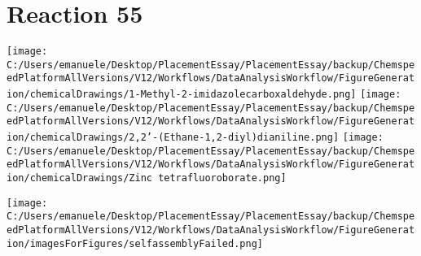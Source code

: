 \documentclass{article}%
\begin{document}
\section*{Reaction 55}%
%
\begin{scheme}[H]%
\begin{minipage}{0.5\textwidth}%
\texttt{[image: C:/Users/emanuele/Desktop/PlacementEssay/PlacementEssay/backup/ChemspeedPlatformAllVersions/V12/Workflows/DataAnalysisWorkflow/FigureGeneration/chemicalDrawings/1-Methyl-2-imidazolecarboxaldehyde.png]}%
\texttt{[image: C:/Users/emanuele/Desktop/PlacementEssay/PlacementEssay/backup/ChemspeedPlatformAllVersions/V12/Workflows/DataAnalysisWorkflow/FigureGeneration/chemicalDrawings/2,2'-(Ethane-1,2-diyl)dianiline.png]}%
\texttt{[image: C:/Users/emanuele/Desktop/PlacementEssay/PlacementEssay/backup/ChemspeedPlatformAllVersions/V12/Workflows/DataAnalysisWorkflow/FigureGeneration/chemicalDrawings/Zinc tetrafluoroborate.png]}%
\end{minipage}%
\begin{minipage}{0.5\textwidth}%
\begin{center}%
\texttt{[image: C:/Users/emanuele/Desktop/PlacementEssay/PlacementEssay/backup/ChemspeedPlatformAllVersions/V12/Workflows/DataAnalysisWorkflow/FigureGeneration/imagesForFigures/selfassemblyFailed.png]}%
\end{center}%
\end{minipage}%
\caption{Self-assembly of components 12, 20, with Zinc(II) in a 3.0:1.5:1.0 molar ratio in CH$_3$CN at 60\textdegree C for 40h. These are the reagents (starting materials) for reaction 55.}%
\end{scheme}%
\end{document}
